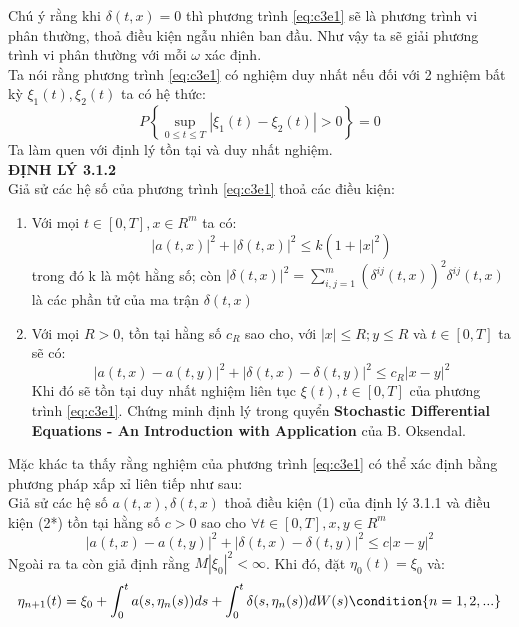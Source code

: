 \documentclass[12pt,a4paper]{article}
\begin{document}
Chú ý rằng khi $\delta(t,x)=0$ thì phương trình \eqref{eq:c3e1} sẽ là phương trình vi phân thường, thoả điều kiện ngẫu nhiên ban đầu. Như vậy ta sẽ giải phương trình vi phân thường với mỗi $\omega$ xác định.\\
Ta nói rằng phương trình \eqref{eq:c3e1} có nghiệm duy nhất nếu đối với 2 nghiệm bất kỳ $\xi_1(t),\xi_2(t)$ ta có hệ thức:\\
\begin{equation*}
	P\left\{\sup_{0\leq t\leq T}|\xi_1(t)-\xi_2(t)|>0 \right\}=0
\end{equation*}
Ta làm quen với định lý tồn tại và duy nhất nghiệm.\\
\textbf{ĐỊNH LÝ 3.1.2}\\
Giả sử các hệ số của phương trình \eqref{eq:c3e1} thoả các điều kiện:
\begin{enumerate}[(1)]
	\item Với mọi $t\in[0,T],x\in R^m$ ta có:
\begin{equation*}
	|a(t,x)|^2+|\delta(t,x)|^2\leq k(1+|x|^2)
\end{equation*}
trong đó k là một hằng số; còn $|\delta(t,x)|^2=\sum\limits_{i,j=1}^m(\delta^{ij}(t,x))^2\delta^{ij}(t,x)$ là các phần tử của ma trận $\delta(t,x)$
	\item Với mọi $R>0$, tồn tại hằng số $c_R$ sao cho, với $|x|\leq R;y\leq R$ và $t\in[0,T]$ ta sẽ có:
\begin{equation*}
	|a(t,x)-a(t,y)|^2+|\delta(t,x)-\delta(t,y)|^2\leq c_R|x-y|^2
\end{equation*}
Khi đó sẽ tồn tại duy nhất nghiệm liên tục $\xi(t),t\in[0,T]$ của phương trình \eqref{eq:c3e1}. Chứng minh định lý trong quyển \textbf{Stochastic Differential Equations - An Introduction with Application} của B. Oksendal.
\end{enumerate}
Mặc khác ta thấy rằng nghiệm của phương trình \eqref{eq:c3e1} có thể xác định bằng phương pháp xấp xỉ liên tiếp như sau:\\
Giả sử các hệ số $a(t,x),\delta(t,x)$ thoả điều kiện (1) của định lý 3.1.1 và điều kiện (2*) tồn tại hằng số $c>0$ sao cho $\forall t\in[0,T],x,y\in R^m$
\begin{equation*}
	|a(t,x)-a(t,y)|^2+|\delta(t,x)-\delta(t,y)|^2\leq c|x-y|^2
\end{equation*}
Ngoài ra ta còn giả định rằng $M|\xi_0|^2<\infty$. Khi đó, đặt $\eta_0(t)=\xi_0$ và:
\begin{equation*}
	\eta_{n+1}(t)=\xi_0+\int_{0}^ta(s,\eta_n(s))ds+\int_0^t\delta(s,\eta_n(s))dW(s) \condition{n=1,2,...}
\end{equation*}
\end{document}
